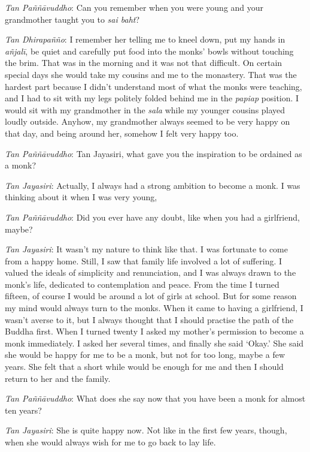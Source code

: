 \emph{Tan Paññāvuddho}‎: Can you remember when you were young and your
grandmother taught you to \emph{sai baht}?

\emph{Tan Dhirapañño}‎: I remember her telling me to kneel down, put my
hands in \emph{añjalī}, be quiet and carefully put food into the monks'
bowls without touching the brim. That was in the morning and it was not
that difficult. On certain special days she would take my cousins and me
to the monastery. That was the hardest part because I didn't understand
most of what the monks were teaching, and I had to sit with my legs
politely folded behind me in the \emph{papiap} position. I would sit
with my grandmother in the \emph{sala} while my younger cousins played
loudly outside. Anyhow, my grandmother always seemed to be very happy on
that day, and being around her, somehow I felt very happy too.

\emph{Tan Paññāvuddho}‎: Tan Jayasiri, what gave you the inspiration to
be ordained as a monk?

\emph{Tan Jayasiri}: Actually, I always had a strong ambition to become
a monk. I was thinking about it when I was very young,

\emph{Tan Paññāvuddho}‎: Did you ever have any doubt, like when you had
a girlfriend, maybe?

\emph{Tan Jayasiri}: It wasn't my nature to think like that. I was
fortunate to come from a happy home. Still, I saw that family life
involved a lot of suffering. I valued the ideals of simplicity and
renunciation, and I was always drawn to the monk's life, dedicated to
contemplation and peace. From the time I turned fifteen, of course I
would be around a lot of girls at school. But for some reason my mind
would always turn to the monks. When it came to having a girlfriend, I
wasn't averse to it, but I always thought that I should practise the
path of the Buddha first. When I turned twenty I asked my mother's
permission to become a monk immediately. I asked her several times, and
finally she said `Okay.' She said she would be happy for me to be a
monk, but not for too long, maybe a few years. She felt that a short
while would be enough for me and then I should return to her and the
family.

\emph{Tan Paññāvuddho}‎: What does she say now that you have been a monk
for almost ten years?

\emph{Tan Jayasiri}: She is quite happy now. Not like in the first few
years, though, when she would always wish for me to go back to lay life.

